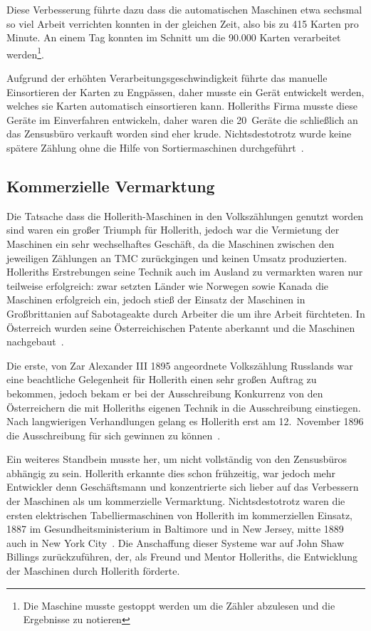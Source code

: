 \documentclass[parskip=half]{scrartcl}
\begin{document}
Diese Verbesserung führte dazu dass die automatischen Maschinen etwa sechsmal
so viel Arbeit verrichten konnten in der gleichen Zeit, also bis zu 415 Karten
pro Minute. An einem Tag konnten im Schnitt um die 90.000 Karten verarbeitet
werden\footnote{Die Maschine musste gestoppt werden um die Zähler abzulesen und
die Ergebnisse zu notieren}.

Aufgrund der erhöhten Verarbeitungsgeschwindigkeit führte das manuelle
Einsortieren der Karten zu Engpässen, daher musste ein Gerät entwickelt werden,
welches sie Karten automatisch einsortieren kann. Holleriths Firma musste diese
Geräte im Einverfahren entwickeln, daher waren die 20~Geräte die schließlich an
das Zensusbüro verkauft worden sind eher krude. Nichtsdestotrotz wurde keine
spätere Zählung ohne die Hilfe von Sortiermaschinen
durchgeführt~\cite{truesdell1965development}.

\subsection{Kommerzielle Vermarktung}
\label{sec:commerce}

Die Tatsache dass die Hollerith-Maschinen in den Volkszählungen genutzt worden
sind waren ein großer Triumph für Hollerith, jedoch war die Vermietung der
Maschinen ein sehr wechselhaftes Geschäft, da die Maschinen zwischen den
jeweiligen Zählungen an TMC zurückgingen und keinen Umsatz produzierten.
Holleriths Erstrebungen seine Technik auch im Ausland zu vermarkten waren nur
teilweise erfolgreich: zwar setzten Länder wie Norwegen sowie Kanada die
Maschinen erfolgreich ein, jedoch stieß der Einsatz der Maschinen in
Großbrittanien auf Sabotageakte durch Arbeiter die um ihre Arbeit fürchteten.
In Österreich wurden seine Österreichischen Patente aberkannt und die Maschinen
nachgebaut~\cite{austrian1982herman}.

Die erste, von Zar Alexander III 1895 angeordnete Volkszählung Russlands war
eine beachtliche Gelegenheit für Hollerith einen sehr großen Auftrag zu
bekommen, jedoch bekam er bei der Ausschreibung Konkurrenz von den
Österreichern die mit Holleriths eigenen Technik in die Ausschreibung
einstiegen. Nach langwierigen Verhandlungen gelang es Hollerith erst am
12.~November 1896 die Ausschreibung für sich gewinnen zu
können~\cite{austrian1982herman}.

Ein weiteres Standbein musste her, um nicht vollständig von den Zensusbüros
abhängig zu sein. Hollerith erkannte dies schon frühzeitig, war jedoch mehr
Entwickler denn Geschäftsmann und konzentrierte sich lieber auf das Verbessern
der Maschinen als um kommerzielle Vermarktung. Nichtsdestotrotz waren die
ersten elektrischen Tabelliermaschinen von Hollerith im kommerziellen Einsatz,
1887 im Gesundheitsministerium in Baltimore und in New Jersey, mitte 1889 auch
in New York City~\cite{austrian1982herman}. Die Anschaffung dieser Systeme war
auf John Shaw Billings zurückzuführen, der, als Freund und Mentor Holleriths,
die Entwicklung der Maschinen durch Hollerith förderte.
\end{document}
